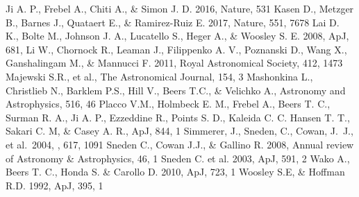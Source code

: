 \documentclass[a4paper,fleqn,usenatbib]{mnras}
\begin{document}
\begin{thebibliography}{99}
		Ji A. P., Frebel A., Chiti A., \& Simon J. D. 2016, Nature, 531
		Kasen D., Metzger B., Barnes J., Quataert E., \& Ramirez-Ruiz E. 2017, Nature, 551, 7678
		Lai D. K., Bolte M., Johnson J. A., Lucatello S., Heger A., \& Woosley S. E. 2008, ApJ, 681,
		Li W., Chornock R., Leaman J., Filippenko A. V., Poznanski D., Wang X., Ganshalingam M., \& Mannucci F. 2011, Royal Astronomical Society, 412, 1473
		Majewski S.R., et al., The Astronomical Journal, 154, 3
		Mashonkina L., Christlieb N., Barklem P.S., Hill V., Beers T.C., \& Velichko A., Astronomy and Astrophysics, 516, 46
		Placco V.M., Holmbeck E. M., Frebel A., Beers T. C., Surman R. A., Ji A. P., Ezzeddine R., Points S. D., Kaleida C. C. Hansen T. T., Sakari C. M, \& Casey A. R., ApJ, 844, 1
		 Simmerer, J., Sneden, C., Cowan, J.~J., et al.\ 2004, \apj, 617, 1091 
		Sneden C., Cowan J.J., \& Gallino R. 2008, Annual review of Astronomy \& Astrophysics, 46, 1
		Sneden C. et al. 2003, ApJ, 591, 2
		Wako A., Beers T. C., Honda S. \& Carollo D. 2010, ApJ, 723, 1
		Woosley S.E, \& Hoffman R.D. 1992, ApJ, 395, 1
	\end{thebibliography}
	
\end{document}
